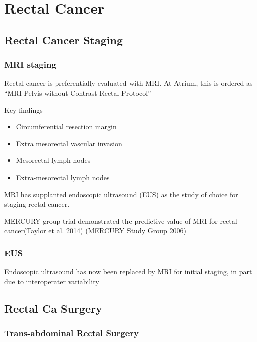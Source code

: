 \documentclass[
  letterpaper,
]{scrbook}
\providecommand{\tightlist}{%
  \setlength{\itemsep}{0pt}\setlength{\parskip}{0pt}}
\begin{document}
\part{Rectal Cancer}

\chapter{Rectal Cancer Staging}\label{rectal-cancer-staging}

\section{MRI staging}\label{mri-staging}

Rectal cancer is preferentially evaluated with MRI. At Atrium, this is
ordered as ``MRI Pelvis without Contrast Rectal Protocol''

Key findings

\begin{itemize}
\tightlist
\item
  Circumferential resection margin
\item
  Extra mesorectal vascular invasion
\item
  Mesorectal lymph nodes
\item
  Extra-mesorectal lymph nodes
\end{itemize}

MRI has supplanted endoscopic ultrasound (EUS) as the study of choice
for staging rectal cancer.

MERCURY group trial demonstrated the predictive value of MRI for rectal
cancer(Taylor et al. 2014) (MERCURY Study Group 2006)

\section{EUS}\label{eus}

Endoscopic ultrasound has now been replaced by MRI for initial staging,
in part due to interoperater variability

\chapter{Rectal Ca Surgery}\label{rectal-ca-surgery}

\section{Trans-abdominal Rectal
Surgery}\label{trans-abdominal-rectal-surgery}
\end{document}
